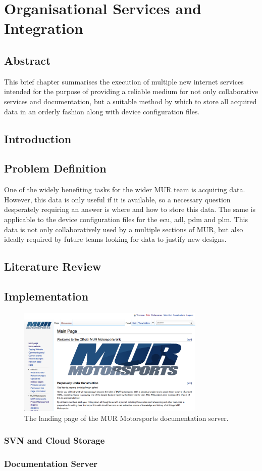 \graphicspath{ {./Images/Documentation_Services/} }

\chapter{Organisational Services and Integration}

\section{Abstract}
This brief chapter summarises the execution of multiple new internet services intended for the purpose of providing a reliable medium for not only collaborative services and documentation, but a suitable method by which to store all acquired data in an orderly fashion along with device configuration files.

\section{Introduction}

\section{Problem Definition}

One of the widely benefiting tasks for the wider MUR team is acquiring data.  However, this data is only useful if it is available, so a necessary question desperately requiring an answer is where and how to store this data.  The same is applicable to the device configuration files for the \acrshort{ecu}, \acrshort{adl}, \acrshort{pdm} and \acrshort{plm}.  This data is not only collaboratively used by a multiple sections of MUR, but also ideally required by future teams looking for data to justify new designs.

\section{Literature Review}


\section{Implementation}


\begin{figure}[h]
	\centering
	\includegraphics[width=0.8\textwidth]{wiki_screenshot.png}
	\caption{The landing page of the MUR Motorsports documentation server.}
	\label{fig:wiki_screenshot}
\end{figure}


\subsection{SVN and Cloud Storage}

\subsection{Documentation Server}